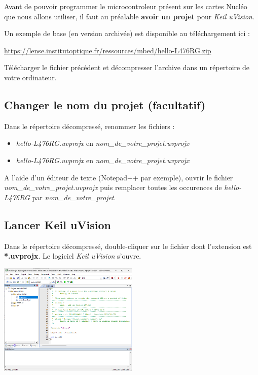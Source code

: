 \documentclass[a4paper,11pt,titlepage]{article} %
\begin{document}
Avant de pouvoir programmer le microcontroleur présent sur les cartes Nucléo que nous allons utiliser, il faut au préalable \textbf{avoir un projet} pour \textsl{Keil uVision}.

Un exemple de base (en version archivée) est disponible au téléchargement ici : 

\href{https://lense.institutoptique.fr/ressources/mbed/hello-L476RG.zip}{https://lense.institutoptique.fr/ressources/mbed/hello-L476RG.zip}

\Manip Télécharger le fichier précédent et décompresser l'archive dans un répertoire de votre ordinateur.

\subsection{Changer le nom du projet (facultatif)}

\Manip Dans le répertoire décompressé, renommer les fichiers :

\begin{itemize}
	\item \textsl{hello-L476RG.uvprojx} en \textsl{nom\_de\_votre\_projet.uvprojx}
	\item \textsl{hello-L476RG.uvprojx} en \textsl{nom\_de\_votre\_projet.uvprojx}
\end{itemize}

\Manip A l'aide d'un éditeur de texte (Notepad++ par exemple), ouvrir le fichier \textsl{nom\_de\_votre\_projet.uvprojx} puis remplacer toutes les occurences de \textsl{hello-L476RG} par \textsl{nom\_de\_votre\_projet}.


\subsection{Lancer Keil uVision}

\Manip Dans le répertoire décompressé, double-cliquer sur le fichier dont l'extension est \textbf{*.uvprojx}. Le logiciel \textit{Keil uVision} s'ouvre.

\begin{center}
	\includegraphics[width=0.5\textwidth]{images/uvision_interface.png}
\end{center}
\end{document}
